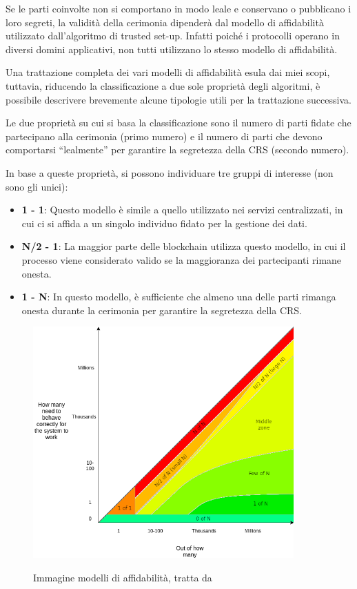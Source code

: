 Se le parti coinvolte non si comportano in modo leale e conservano o pubblicano i loro segreti, la validità della
cerimonia dipenderà dal modello di affidabilità utilizzato dall'algoritmo di trusted set-up. Infatti poiché i protocolli
operano in diversi domini applicativi, non tutti utilizzano lo stesso modello di affidabilità. 

Una trattazione completa dei vari modelli di affidabilità esula dai miei scopi, tuttavia, riducendo la classificazione a due sole proprietà
degli algoritmi, è possibile descrivere brevemente alcune tipologie utili per la trattazione successiva. 

Le due proprietà su cui si basa la classificazione sono il numero di parti fidate che partecipano alla cerimonia (primo numero) e il numero di
parti che devono comportarsi “lealmente” per garantire la segretezza della CRS (secondo numero).

In base a queste proprietà, si possono individuare tre gruppi di interesse (non sono gli unici):
\begin{itemize}
    \item \textbf{1 - 1}: Questo modello è simile a quello utilizzato nei servizi centralizzati, in cui ci si affida a un singolo
    individuo fidato per la gestione dei dati. 
    \item \textbf{N/2 - 1}: La maggior parte delle blockchain utilizza questo modello, in
    cui il processo viene considerato valido se la maggioranza dei partecipanti rimane onesta.
    \item \textbf{1 - N}: In questo modello, è sufficiente che almeno una delle parti rimanga onesta durante la
    cerimonia per garantire la segretezza della CRS.
\end{itemize}

\begin{figure}[H]
    \centering
    \includegraphics[width=10cm]{./chapters/1.state-of-art/images/12.trusted_models.png}
    \label{fig:trusted_models}
    \captionsetup{justification=centering}
    \caption{Immagine modelli di affidabilità, tratta da \cite{trusted-models}}
\end{figure}

